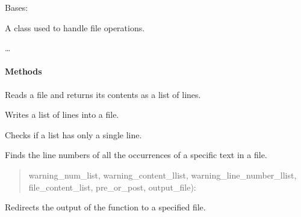 \documentclass[letterpaper,10pt,english]{sphinxmanual}
\begin{document}
\begin{fulllineitems}
\label{\detokenize{main.doxygen_management:main.doxygen_management.file_handler.FileHandler}}
\pysigstartsignatures
{}
\pysigstopsignatures
\sphinxAtStartPar
Bases: 

\sphinxAtStartPar
A class used to handle file operations.

\sphinxAtStartPar
…


\paragraph{Methods}
\label{\detokenize{main.doxygen_management:id18}}\begin{description}
\sphinxAtStartPar
Reads a file and returns its contents as a list of lines.

\sphinxAtStartPar
Writes a list of lines into a file.

\sphinxAtStartPar
Checks if a list has only a single line.

\sphinxAtStartPar
Finds the line numbers of all the occurrences of a specific text in a file.

\begin{quote}

\sphinxAtStartPar
warning\_num\_list, warning\_content\_llist,
warning\_line\_number\_llist, file\_content\_list, pre\_or\_post,
output\_file):
\end{quote}

\sphinxAtStartPar
Redirects the output of the  function to a specified file.

\end{description}


\end{fulllineitems}
\end{document}
